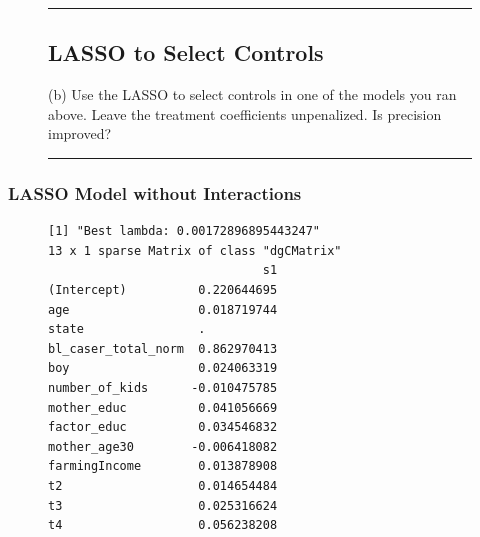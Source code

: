 \documentclass{article}
\newenvironment{colorparagraph}[1]{\par\color{#1}}{\par}
\begin{document}
\begin{figure}[H]
\begin{colorparagraph}{questioncolor}
\label{q3b}
\rule{\textwidth}{0.5pt}
\subsection{LASSO to Select Controls}
(b) Use the LASSO to select controls in one of the models you ran above. Leave the treatment coefficients unpenalized. Is precision improved?

\rule{\textwidth}{0.5pt}
\end{colorparagraph}
\end{figure}

\subsubsection*{LASSO Model without Interactions}
\begin{figure}[H]
\begin{lstlisting}[style=RstyleComment, caption=Regression with Demeaned Covariates and Interaction with Discrete Variables]
[1] "Best lambda: 0.00172896895443247"
13 x 1 sparse Matrix of class "dgCMatrix"
                              s1
(Intercept)          0.220644695
age                  0.018719744
state                .          
bl_caser_total_norm  0.862970413
boy                  0.024063319
number_of_kids      -0.010475785
mother_educ          0.041056669
factor_educ          0.034546832
mother_age30        -0.006418082
farmingIncome        0.013878908
t2                   0.014654484
t3                   0.025316624
t4                   0.056238208
\end{lstlisting}
\end{figure}
\end{document}
